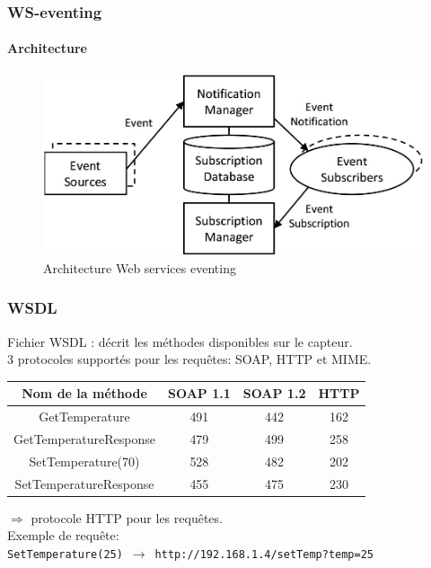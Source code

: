 \begin{frame}
 \frametitle{WS-eventing}
 \framesubtitle{Architecture}
 \begin{figure}
  \centering
  \includegraphics[scale=0.43]{figures/eventing.jpg}
  \caption{Architecture Web services eventing}
 \end{figure}
\end{frame}
\begin{frame}
 \frametitle{WSDL}
 Fichier WSDL : décrit les méthodes disponibles sur le capteur.\\ %
 3 protocoles supportés pour les requêtes: SOAP, HTTP et MIME.\\
 \vspace{3mm}
 \begin{center}
 \begin{tabular}{|c|c|c|c|}
 \hline
 Nom de la méthode & SOAP 1.1 & SOAP 1.2 & HTTP\\
 \hline
 GetTemperature & 491 & 442 & 162\\
 GetTemperatureResponse & 479 & 499 & 258\\
 SetTemperature(70) & 528 & 482 & 202\\
 SetTemperatureResponse & 455 & 475 & 230\\
 \hline
 \end{tabular}
 \end{center}
 $\Rightarrow$ protocole HTTP pour les requêtes. \\ 
 \vspace{2mm}
 Exemple de requête:\\
 \texttt{SetTemperature(25)}~$\rightarrow$~\texttt{http://192.168.1.4/setTemp?temp=25}
\end{frame}
